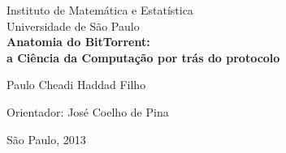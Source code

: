 \documentclass[a4paper, 11pt, oneside, brazil]{book}
\begin{document}
\thispagestyle{empty}

\frontmatter

% 


\begin{center}
	\large
		Instituto de Matemática e Estatística\\
		Universidade de São Paulo\\[-0.25cm]

	\vspace*{5.5cm}
	\textbf{\Large Anatomia do BitTorrent: \\ a Ciência da Computação por trás do protocolo}

	\vspace*{2.0cm}

	\Large{Paulo Cheadi Haddad Filho} 

	\vskip 0.6cm

	Orientador: José Coelho de Pina

	\vspace*{\fill}
	\normalsize{São Paulo, 2013}
\end{center}

\afterpage{\clearpage}





\tableofcontents

\printglossaries

\listoffigures

\begin{comment}
	\setstretch{1.5}  %
	\afterpage{\clearpage}  %

	\listofsymbols{ll}  %
	{

	}

	\setstretch{1.3}
\end{comment}
\end{document}
